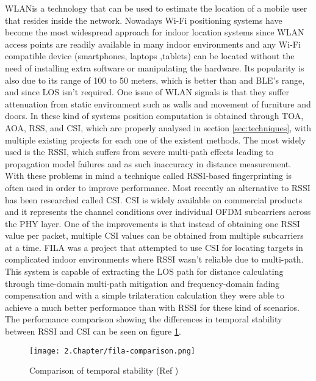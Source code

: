 \ac{WLAN}is a technology that can be used to estimate the location of a mobile user that resides inside the network. Nowadays Wi-Fi positioning systems have become the most widespread approach for indoor location systems since \ac{WLAN} access points are readily available in many indoor environments and any Wi-Fi compatible device (smartphones, laptops ,tablets) can be located without the need of installing extra software or manipulating the hardware. Its popularity is also due to its range of 100 to 50 meters, which is better than  and BLE's range, and since \ac{LOS} isn't required. One issue of \ac{WLAN} signals is that they suffer attenuation from static environment such as walls and movement of furniture and doors. In these kind of systems position computation is obtained through TOA, AOA, RSS, and CSI, which are properly analysed in section \ref{sec:techniques}, with multiple existing projects for each one of the existent methods. The most widely used is the \ac{RSSI}, which suffers from severe multi-path effects leading to propagation model failures and as such inaccuracy in distance measurement. With these problems in mind a technique called RSSI-based fingerprinting is often used in order to improve performance.
Most recently an alternative to RSSI has been researched called \ac{CSI}. \ac{CSI} is widely available on commercial products and it represents the channel conditions over individual OFDM subcarriers across the \ac{PHY} layer. One of the improvements is that instead of obtaining one \ac{RSSI} value per packet, multiple \ac{CSI} values can be obtained from multiple subcarriers at a time. FILA \cite{fila} was a project that attempted to use \ac{CSI} for locating targets in complicated indoor environments where RSSI wasn't reliable due to multi-path. This system is capable of extracting the \ac{LOS} path for distance calculating through time-domain multi-path mitigation and frequency-domain fading compensation and with a simple trilateration calculation they were able to achieve a much better performance than with \ac{RSSI} for these kind of scenarios. The performance comparison showing the differences in temporal stability between \ac{RSSI} and \ac{CSI} can be seen on figure \ref{fig:fila}.

\begin{figure}[H]
	\centering
		\texttt{[image: 2.Chapter/fila-comparison.png]}
	\caption[Comparison of temporal stability (Ref \cite{fila}) ]{Comparison of temporal stability (Ref \cite{fila})}
	\label{fig:fila}
\end{figure}

